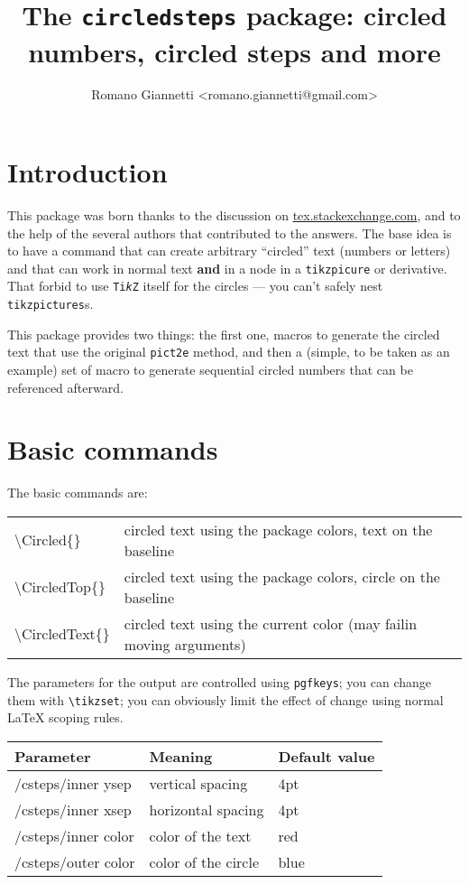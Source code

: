 \documentclass{ltxdoc}
\title{The \texttt{circledsteps} package: circled numbers, circled steps and more}
\author{Romano Giannetti <romano.giannetti@gmail.com>}
\begin{document}
\maketitle

\section{Introduction}

This package was born thanks to the discussion on \href{https://tex.stackexchange.com/questions/7032/good-way-to-make-textcircled-numbers}{tex.stackexchange.com}, and to the help of the several authors that contributed to the answers. The base idea is to have a command that can create arbitrary ``circled'' text (numbers or letters) and that can work in normal text \textbf{and} in a node in a \texttt{tikzpicure} or derivative. That forbid to use \texttt{Ti\emph{k}Z} itself for the circles --- you can't safely nest \texttt{tikzpictures}s.

This package provides two things: the first one, macros to generate the circled text that use the original \texttt{pict2e} method, and then a (simple, to be taken as an example) set of macro to generate sequential circled numbers that can be referenced afterward.

\section{Basic commands}

The basic commands are:

\begin{tabular}{>{\ttfamily\textbackslash}ll}
    \toprule
    Circled\{\} & circled text using the package colors, text on the baseline\\
    CircledTop\{\} & circled text using the package colors, circle on the baseline\\
    CircledText\{\} & circled text using the current color (may fail\footnotemark in moving arguments)\\
    \bottomrule
\end{tabular}

The parameters for the output are controlled using \texttt{pgfkeys}; you can change them with \verb|\tikzset|; you can obviously limit the effect of change using normal \LaTeX{} scoping rules.

\begin{tabular}{>{\ttfamily}lll}
    \toprule
    \textbf{Parameter} & \textbf{Meaning} & \textbf{Default value} \\
    \midrule
    /csteps/inner ysep  & vertical spacing & 4pt\\
    /csteps/inner xsep  & horizontal spacing & 4pt\\
    /csteps/inner color & color of the text  & red\\
    /csteps/outer color & color of the circle & blue\\
    \bottomrule
\end{tabular}
\end{document}
